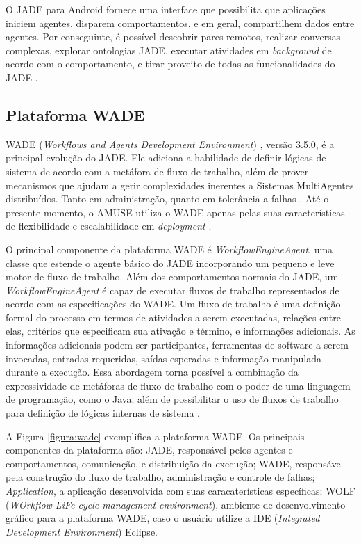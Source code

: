 O JADE para Android fornece uma interface que possibilita que aplicações
iniciem agentes, disparem comportamentos, e em geral, compartilhem dados entre
agentes. Por conseguinte, é possível descobrir pares remotos, realizar
conversas complexas, explorar ontologias JADE, executar atividades em
\textit{background} de acordo com o comportamento, e tirar proveito de todas as
funcionalidades do JADE \cite{bergenti2014}.

    \subsection{Plataforma WADE}

WADE (\textit{Workflows and Agents Development Environment}) \cite{wade},
versão 3.5.0, é a principal evolução do JADE. Ele adiciona a habilidade de
definir lógicas de sistema de acordo com a metáfora de fluxo de trabalho, além
de prover mecanismos que ajudam a gerir complexidades inerentes a Sistemas
MultiAgentes distribuídos. Tanto em administração, quanto em tolerância a
falhas \cite{wade2009}. Até o presente momento, o AMUSE utiliza o WADE apenas
pelas suas características de flexibilidade e escalabilidade em
\textit{deployment} \cite{bergenti2015}.

O principal componente da plataforma WADE é \textit{WorkflowEngineAgent}, uma
classe que estende o agente básico do JADE incorporando um pequeno e leve motor
de fluxo de trabalho. Além dos comportamentos normais do JADE, um
\textit{WorkflowEngineAgent} é capaz de executar fluxos de trabalho
representados de acordo com as especificações do WADE. Um fluxo de trabalho é
uma definição formal do processo em termos de atividades a serem executadas,
relações entre elas, critérios que especificam sua ativação e término, e
informações adicionais. As informações adicionais podem ser participantes,
ferramentas de software a serem invocadas, entradas requeridas, saídas esperadas
e informação manipulada durante a execução. Essa abordagem torna possível a
combinação da expressividade de metáforas de fluxo de trabalho com o poder de
uma linguagem de programação, como o Java; além de possibilitar o uso de fluxos
de trabalho para definição de lógicas internas de sistema \cite{wade}.

A Figura \ref{figura:wade} exemplifica a plataforma WADE. Os principais
componentes da plataforma são: JADE, responsável pelos agentes e comportamentos,
comunicação, e distribuição da execução; WADE, responsável pela construção do
fluxo de trabalho, administração e controle de falhas; \textit{Application}, a
aplicação desenvolvida com suas caracaterísticas específicas; WOLF
(\textit{WOrkflow LiFe cycle management environment}), ambiente de
desenvolvimento gráfico para a plataforma WADE, caso o usuário utilize a IDE
(\textit{Integrated Development Environment}) Eclipse.

